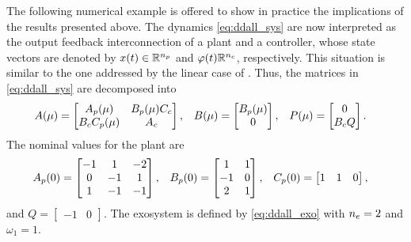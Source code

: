 \begin{example}
  The following numerical example is offered to show in practice the implications of the results presented above. The dynamics \eqref{eq:ddall_sys} are now interpreted as the output feedback interconnection of a plant and a controller, whose state vectors are denoted by $x(t)\in\mathbb{R}^{{n_p}}$ and $\varphi(t)\mathbb{R}^{{n_c}}$, respectively. This situation is similar to the one addressed by the linear case of . Thus, the matrices in \eqref{eq:ddall_sys} are decomposed into
  \begin{align}
    \label{eq:ddall_example_sys}
    A(\mu) &= \begin{bmatrix}A_p(\mu) & B_p(\mu)C_c \\ B_cC_p(\mu) & A_c\end{bmatrix}, & B(\mu) &= \begin{bmatrix}B_p(\mu) \\ 0\end{bmatrix}, & P(\mu) &= \begin{bmatrix}0 \\ B_c Q\end{bmatrix}.
  \end{align}
  The nominal values for the plant are
  \begin{align}
    \label{eq:ddall_example_A0}
    A_p(0) &= \begin{bmatrix}
      -1 & 1 & -2 \\ 0 & -1 & 1 \\ 1 & -1 & -1
    \end{bmatrix}, & B_p(0) &= \begin{bmatrix}
      1 & 1 \\ -1 & 0 \\ 2 & 1
    \end{bmatrix}, & C_p(0) &= \begin{bmatrix}
      1 & 1 & 0
    \end{bmatrix},
  \end{align}
  and $Q = \begin{bmatrix}-1 & 0\end{bmatrix}$.
  The exosystem is defined by \eqref{eq:ddall_exo} with ${n_e} = 2$ and $\omega_1 = 1$.


\end{example}
